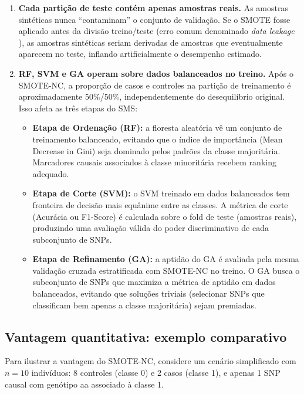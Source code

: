 \documentclass[
    12pt,
    a4paper,
    oneside,
    english,
    french,
    spanish,
    brazil
    ]{abntex2}
\newcommand{\novo}[1]{\textcolor{corNova}{#1}}
\begin{document}
\begin{enumerate}
  \item \novo{\textbf{Cada partição de teste contém apenas amostras reais.} As amostras sintéticas nunca ``contaminam'' o conjunto de validação. Se o SMOTE fosse aplicado antes da divisão treino/teste (erro comum denominado \textit{data leakage} \cite{ambroise2002selection,hastie2009elements}), as amostras sintéticas seriam derivadas de amostras que eventualmente aparecem no teste, inflando artificialmente o desempenho estimado.}
  \item \novo{\textbf{RF, SVM e GA operam sobre dados balanceados no treino.} Após o SMOTE-NC, a proporção de casos e controles na partição de treinamento é aproximadamente 50\%/50\%, independentemente do desequilíbrio original. Isso afeta as três etapas do SMS:
  \begin{itemize}
    \item \textbf{Etapa de Ordenação (RF):} a floresta aleatória vê um conjunto de treinamento balanceado, evitando que o índice de importância (Mean Decrease in Gini) seja dominado pelos padrões da classe majoritária. Marcadores causais associados à classe minoritária recebem ranking adequado.
    \item \textbf{Etapa de Corte (SVM):} o SVM treinado em dados balanceados tem fronteira de decisão mais equânime entre as classes. A métrica de corte (Acurácia ou F1-Score) é calculada sobre o fold de teste (amostras reais), produzindo uma avaliação válida do poder discriminativo de cada subconjunto de SNPs.
    \item \textbf{Etapa de Refinamento (GA):} a aptidão do GA é avaliada pela mesma validação cruzada estratificada com SMOTE-NC no treino. O GA busca o subconjunto de SNPs que maximiza a métrica de aptidão em dados balanceados, evitando que soluções triviais (selecionar SNPs que classificam bem apenas a classe majoritária) sejam premiadas.
  \end{itemize}}
\end{enumerate}

\subsection*{Vantagem quantitativa: exemplo comparativo}

\novo{Para ilustrar a vantagem do SMOTE-NC, considere um cenário simplificado com $n = 10$ indivíduos: 8 controles (classe 0) e 2 casos (classe 1), e apenas 1 SNP causal com genótipo aa associado à classe 1.}
\end{document}
